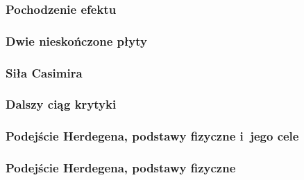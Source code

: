 \documentclass[10pt,t]{beamer}
\begin{document}
\begin{frame}
  \frametitle{Pochodzenie efektu}




\end{frame}





\begin{frame}
  \frametitle{Dwie nieskończone płyty}




\end{frame}





\begin{frame}
  \frametitle{Siła Casimira}




\end{frame}





\begin{frame}
  \frametitle{Dalszy ciąg krytyki}




\end{frame}





\begin{frame}
  \frametitle{Podejście Herdegena, podstawy fizyczne i~jego cele}




\end{frame}





\begin{frame}
  \frametitle{Podejście Herdegena, podstawy fizyczne}




\end{frame}
\end{document}
